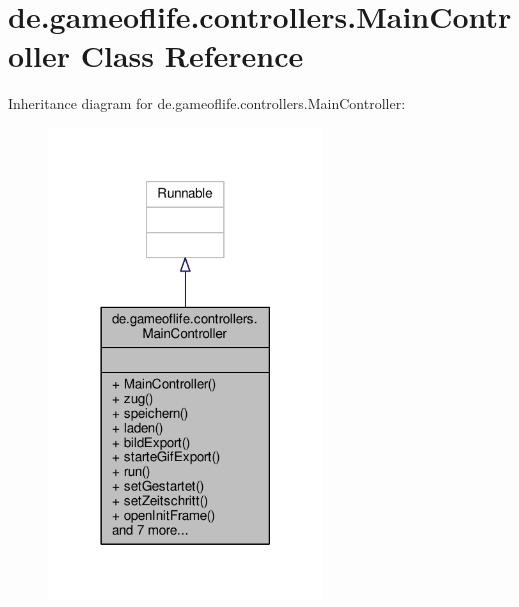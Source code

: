 \hypertarget{classde_1_1gameoflife_1_1controllers_1_1MainController}{\section{de.\-gameoflife.\-controllers.\-Main\-Controller Class Reference}
\label{classde_1_1gameoflife_1_1controllers_1_1MainController}
}


Inheritance diagram for de.\-gameoflife.\-controllers.\-Main\-Controller\-:\nopagebreak
\begin{figure}[H]
\begin{center}
\leavevmode
\includegraphics[width=206pt]{classde_1_1gameoflife_1_1controllers_1_1MainController__inherit__graph}
\end{center}
\end{figure}


